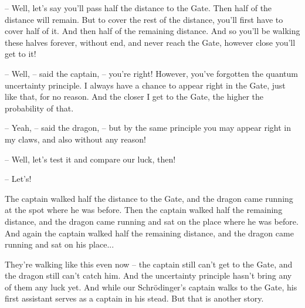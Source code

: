 \documentclass[ebook,twoside,final,openright]{memoir}
\begin{document}
– Well, let’s say you’ll pass half the distance to the Gate. Then half of the distance will remain. But to cover the rest of the distance, you’ll first have to cover half of it. And then half of the remaining distance. And so you’ll be walking these halves forever, without end, and never reach the Gate, however close you’ll get to it!\par
– Well, – said the captain, – you’re right! However, you’ve forgotten the quantum uncertainty principle. I always have a chance to appear right in the Gate, just like that, for no reason. And the closer I get to the Gate, the higher the probability of that.\par
– Yeah, – said the dragon, – but by the same principle you may appear right in my claws, and also without any reason!\par
– Well, let’s test it and compare our luck, then!\par
– Let’s!\par
\par
The captain walked half the distance to the Gate, and the dragon came running at the spot where he was before. Then the captain walked half the remaining distance, and the dragon came running and sat on the place where he was before. And again the captain walked half the remaining distance, and the dragon came running and sat on his place...\par
\par
They're walking like this even now – the captain still can’t get to the Gate, and the dragon still can’t catch him. And the uncertainty principle hasn’t bring any of them any luck yet. And while our Schrödinger’s captain walks to the Gate, his first assistant serves as a captain in his stead. But that is another story.
\end{document}
